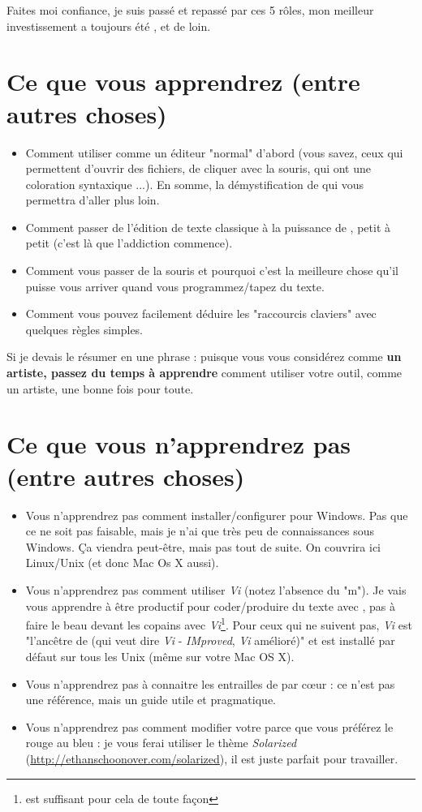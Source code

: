 Faites moi confiance, je suis passé et repassé par ces 5 rôles, mon meilleur investissement a toujours été \vim, et de loin.

\section{Ce que vous apprendrez (entre autres choses)}

\begin{itemize}
    \item Comment utiliser \vim comme un éditeur "normal" d'abord (vous savez, ceux qui permettent d'ouvrir des fichiers, de cliquer avec la souris, qui ont une coloration syntaxique ...). En somme, la démystification de \vim qui vous permettra d'aller plus loin.
    \item Comment passer de l'édition de texte classique à la puissance de \vim, petit à petit (c'est là que l'addiction commence).
    \item Comment vous passer de la souris et pourquoi c'est la meilleure chose qu'il puisse vous arriver quand vous programmez/tapez du texte.
    \item Comment vous pouvez facilement déduire les "raccourcis claviers" avec quelques règles simples.
\end{itemize}

Si je devais le résumer en une phrase : puisque vous vous considérez comme {\bf un artiste, passez du temps à apprendre} comment utiliser votre outil, comme un artiste, une bonne fois pour toute.

\section{Ce que vous n'apprendrez pas (entre autres choses)}

\begin{itemize}
    \item Vous n'apprendrez pas comment installer/configurer \vim pour Windows. Pas que ce ne soit pas faisable, mais je n'ai que très peu de connaissances sous Windows. Ça viendra peut-être, mais pas tout de suite. On couvrira ici Linux/Unix (et donc Mac Os X aussi).
    \item Vous n'apprendrez pas comment utiliser \emph{Vi} (notez l'absence du "m"). Je vais vous apprendre à être productif pour coder/produire du texte avec \vim, pas à faire le beau devant les copains avec \emph{Vi}\footnote{\vim est suffisant pour cela de toute façon}. Pour ceux qui ne suivent pas, \emph{Vi} est "l'ancêtre de \vim (qui veut dire \emph{Vi} - \emph{IMproved}, \emph{Vi} amélioré)" et est installé par défaut sur tous les Unix (même sur votre Mac OS X).
    \item Vous n'apprendrez pas à connaitre les entrailles de \vim par c\oe ur : ce n'est pas une référence, mais un guide utile et pragmatique.
    \item Vous n'apprendrez pas comment modifier votre \vim parce que vous préférez le rouge au bleu : je vous ferai utiliser le thème \emph{Solarized} (\url{http://ethanschoonover.com/solarized}), il est juste parfait pour travailler.
\end{itemize}


